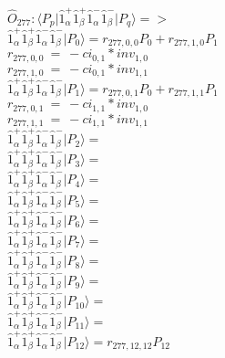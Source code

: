 \documentclass[14pt]{article}
\begin{document}
    $\hat{O}_{277}:  \langle{P_p}\vert \hat{1}_{\alpha}^{+}\hat{1}_{\beta}^{+}\hat{1}_{\alpha}^{-}\hat{1}_{\beta}^{-} \vert{P_q}\rangle => $ \\ 
    $ \hat{1}_{\alpha}^{+}\hat{1}_{\beta}^{+}\hat{1}_{\alpha}^{-}\hat{1}_{\beta}^{-} \vert{P_{0}}\rangle = {r}_{277,0,0}P_{0}+{r}_{277,1,0}P_{1} $ \\ 
    ${r}_{277,0,0}\ =\ -{ci}_{0,1}*{inv}_{1,0} $ \\ 
    ${r}_{277,1,0}\ =\ -{ci}_{0,1}*{inv}_{1,1} $ \\ 
    $ \hat{1}_{\alpha}^{+}\hat{1}_{\beta}^{+}\hat{1}_{\alpha}^{-}\hat{1}_{\beta}^{-} \vert{P_{1}}\rangle = {r}_{277,0,1}P_{0}+{r}_{277,1,1}P_{1} $ \\ 
    ${r}_{277,0,1}\ =\ -{ci}_{1,1}*{inv}_{1,0} $ \\ 
    ${r}_{277,1,1}\ =\ -{ci}_{1,1}*{inv}_{1,1} $ \\ 
    $ \hat{1}_{\alpha}^{+}\hat{1}_{\beta}^{+}\hat{1}_{\alpha}^{-}\hat{1}_{\beta}^{-} \vert{P_{2}}\rangle =  $ \\ 
    $ \hat{1}_{\alpha}^{+}\hat{1}_{\beta}^{+}\hat{1}_{\alpha}^{-}\hat{1}_{\beta}^{-} \vert{P_{3}}\rangle =  $ \\ 
    $ \hat{1}_{\alpha}^{+}\hat{1}_{\beta}^{+}\hat{1}_{\alpha}^{-}\hat{1}_{\beta}^{-} \vert{P_{4}}\rangle =  $ \\ 
    $ \hat{1}_{\alpha}^{+}\hat{1}_{\beta}^{+}\hat{1}_{\alpha}^{-}\hat{1}_{\beta}^{-} \vert{P_{5}}\rangle =  $ \\ 
    $ \hat{1}_{\alpha}^{+}\hat{1}_{\beta}^{+}\hat{1}_{\alpha}^{-}\hat{1}_{\beta}^{-} \vert{P_{6}}\rangle =  $ \\ 
    $ \hat{1}_{\alpha}^{+}\hat{1}_{\beta}^{+}\hat{1}_{\alpha}^{-}\hat{1}_{\beta}^{-} \vert{P_{7}}\rangle =  $ \\ 
    $ \hat{1}_{\alpha}^{+}\hat{1}_{\beta}^{+}\hat{1}_{\alpha}^{-}\hat{1}_{\beta}^{-} \vert{P_{8}}\rangle =  $ \\ 
    $ \hat{1}_{\alpha}^{+}\hat{1}_{\beta}^{+}\hat{1}_{\alpha}^{-}\hat{1}_{\beta}^{-} \vert{P_{9}}\rangle =  $ \\ 
    $ \hat{1}_{\alpha}^{+}\hat{1}_{\beta}^{+}\hat{1}_{\alpha}^{-}\hat{1}_{\beta}^{-} \vert{P_{10}}\rangle =  $ \\ 
    $ \hat{1}_{\alpha}^{+}\hat{1}_{\beta}^{+}\hat{1}_{\alpha}^{-}\hat{1}_{\beta}^{-} \vert{P_{11}}\rangle =  $ \\ 
    $ \hat{1}_{\alpha}^{+}\hat{1}_{\beta}^{+}\hat{1}_{\alpha}^{-}\hat{1}_{\beta}^{-} \vert{P_{12}}\rangle = {r}_{277,12,12}P_{12} $ \\ 
\end{document}
